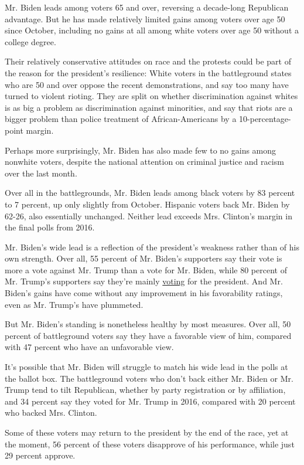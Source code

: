 Mr. Biden leads among voters 65 and over, reversing a decade-long
Republican advantage. But he has made relatively limited gains among
voters over age 50 since October, including no gains at all among white
voters over age 50 without a college degree.

Their relatively conservative attitudes on race and the protests could
be part of the reason for the president's resilience: White voters in
the battleground states who are 50 and over oppose the recent
demonstrations, and say too many have turned to violent rioting. They
are split on whether discrimination against whites is as big a problem
as discrimination against minorities, and say that riots are a bigger
problem than police treatment of African-Americans by a
10-percentage-point margin.

Perhaps more surprisingly, Mr. Biden has also made few to no gains among
nonwhite voters, despite the national attention on criminal justice and
racism over the last month.

Over all in the battlegrounds, Mr. Biden leads among black voters by 83
percent to 7 percent, up only slightly from October. Hispanic voters
back Mr. Biden by 62-26, also essentially unchanged. Neither lead
exceeds Mrs. Clinton's margin in the final polls from 2016.

Mr. Biden's wide lead is a reflection of the president's weakness rather
than of his own strength. Over all, 55 percent of Mr. Biden's supporters
say their vote is more a vote against Mr. Trump than a vote for Mr.
Biden, while 80 percent of Mr. Trump's supporters say they're mainly
\href{https://www.nytimes.com/2020/06/27/us/politics/trump-biden-protests-polling.html}{voting}
for the president. And Mr. Biden's gains have come without any
improvement in his favorability ratings, even as Mr. Trump's have
plummeted.

But Mr. Biden's standing is nonetheless healthy by most measures. Over
all, 50 percent of battleground voters say they have a favorable view of
him, compared with 47 percent who have an unfavorable view.

It's possible that Mr. Biden will struggle to match his wide lead in the
polls at the ballot box. The battleground voters who don't back either
Mr. Biden or Mr. Trump tend to tilt Republican, whether by party
registration or by affiliation, and 34 percent say they voted for Mr.
Trump in 2016, compared with 20 percent who backed Mrs. Clinton.

Some of these voters may return to the president by the end of the race,
yet at the moment, 56 percent of these voters disapprove of his
performance, while just 29 percent approve.

